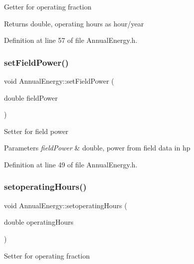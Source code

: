 Getter for operating fraction \begin{DoxyReturn}{Returns}
double, operating hours as hour/year 
\end{DoxyReturn}


Definition at line 57 of file Annual\+Energy.\+h.

\mbox{\label{class_annual_energy_a4f7212fcf2f6fcd2b12f36ca26a368a1}} 
\subsubsection{\texorpdfstring{set\+Field\+Power()}{setFieldPower()}}
{\footnotesize\ttfamily void Annual\+Energy\+::set\+Field\+Power (\begin{DoxyParamCaption}\item[{double}]{field\+Power }\end{DoxyParamCaption})\hspace{0.3cm}{\ttfamily [inline]}}

Setter for field power 
\begin{DoxyParams}{Parameters}
{\em field\+Power} & double, power from field data in hp \\
\hline
\end{DoxyParams}


Definition at line 49 of file Annual\+Energy.\+h.

\mbox{\label{class_annual_energy_a803812f06ca88aca8a02601930e870cf}} 
\subsubsection{\texorpdfstring{setoperating\+Hours()}{setoperatingHours()}}
{\footnotesize\ttfamily void Annual\+Energy\+::setoperating\+Hours (\begin{DoxyParamCaption}\item[{double}]{operating\+Hours }\end{DoxyParamCaption})\hspace{0.3cm}{\ttfamily [inline]}}

Setter for operating fraction


